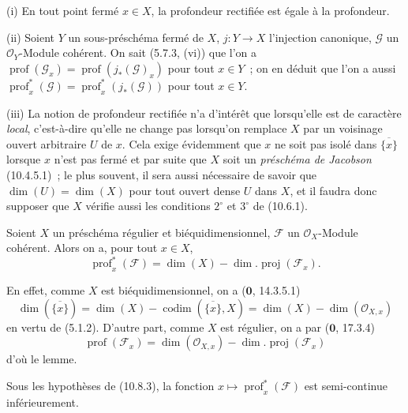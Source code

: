 \begin{remarks}[10.8.2]
\label{IV.10.8.2-fr}
(i) En tout point fermé $x\in X$, la profondeur rectifiée est égale à la
profondeur.

(ii) Soient $Y$ un sous-préschéma fermé de $X$, $j:Y\to X$ l'injection canonique,
$\mathcal G$ un $\mathcal O_Y$-Module cohérent. On sait (5.7.3, (vi)) que l'on a
$\operatorname{prof}(\mathcal G_x)=\operatorname{prof}(j_*(\mathcal G)_x)$ pour tout
$x\in Y$~; on en déduit que l'on a aussi
$\operatorname{prof}^{*}_{x}(\mathcal G)
=\operatorname{prof}^{*}_{x}(j_*(\mathcal G))$ pour tout $x\in Y$.

(iii) La notion de profondeur rectifiée n'a d'intérêt que lorsqu'elle est de
caractère \emph{local}, c'est-à-dire qu'elle ne change pas lorsqu'on remplace $X$
par un voisinage ouvert arbitraire $U$ de $x$. Cela exige évidemment que $x$ ne
soit pas isolé dans $\overline{\{x\}}$ lorsque $x$ n'est pas fermé et par suite
que $X$ soit un \emph{préschéma de Jacobson} (10.4.5.1)~; le plus souvent, il sera
aussi nécessaire de savoir que $\dim(U)=\dim(X)$ pour tout ouvert dense $U$ dans
$X$, et il faudra donc supposer que $X$ vérifie aussi les conditions $2^\circ$ et
$3^\circ$ de (10.6.1).
\end{remarks}

\begin{lemma}[10.8.3]
\label{IV.10.8.3-fr}
Soient $X$ un préschéma régulier et biéquidimensionnel, $\mathcal F$ un
$\mathcal O_X$-Module cohérent. Alors on a, pour tout $x\in X$,
\begin{equation}
\label{IV.10.8.3.1-fr}
\tag{10.8.3.1}
\operatorname{prof}^{*}_{x}(\mathcal F)
=\dim(X)-\dim.\operatorname{proj}(\mathcal F_x).
\end{equation}
\end{lemma}

En effet, comme $X$ est biéquidimensionnel, on a ($\mathbf 0$, 14.3.5.1)
\[
  \dim(\overline{\{x\}})=\dim(X)-\operatorname{codim}(\overline{\{x\}},X)
  =\dim(X)-\dim(\mathcal O_{X,x})
\]
en vertu de (5.1.2). D'autre part, comme $X$ est régulier, on a par
($\mathbf 0$, 17.3.4)
\[
  \operatorname{prof}(\mathcal F_x)
  =\dim(\mathcal O_{X,x})-\dim.\operatorname{proj}(\mathcal F_x)
\]
d'où le lemme.

\begin{corollary}[10.8.4]
\label{IV.10.8.4-fr}
Sous les hypothèses de (10.8.3), la fonction
$x\mapsto\operatorname{prof}^{*}_{x}(\mathcal F)$ est semi-continue inférieurement.
\end{corollary}

